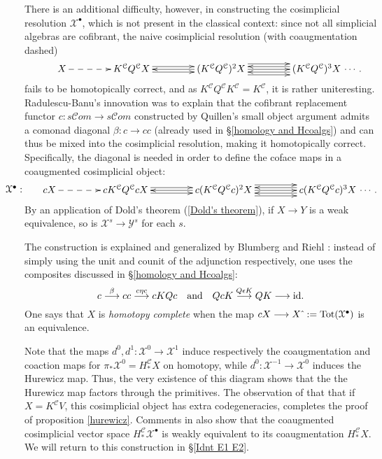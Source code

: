 \documentclass[11pt]{amsart}
\theoremstyle{plain}
\theoremstyle{definition}
\renewcommand{\to}{\longrightarrow}
\newcommand{\scrC}{\mathscr{C}}
\newcommand{\calY}{\mathcal{Y}}
\newcommand{\calX}{\mathcal{X}}
\newcommand{\calC}{\mathcal{C}}
\newcommand{\calx}{\mathcal{X}}
\newcommand{\calc}{\mathcal{C}}
\theoremstyle{plain}
\newcommand{\algcat}{{\scrC\!\textit{om}}}%
\begin{document}
\begin{CPiAlgs and CHalgs}
There is an additional difficulty, however,  in constructing the cosimplicial resolution $\calX^{\bullet}$, which is not present in the classical context: since not all simplicial algebras are cofibrant, the naive cosimplicial resolution (with coaugmentation dashed)
\[\makebox[0cm][r]{\,$\qquad $}\vcenter{
\def\labelstyle{\scriptstyle}
\xymatrix@C=1.5cm@1{
X\,
\ar@{-->}[r]
&
\,K^{\calC}Q^{\calC}X\,
\ar[r];[]
&
\,(K^{\calC}Q^{\calC})^2X\,
\ar@<-.65ex>[l];[]
\ar@<+.65ex>[l];[]
\ar@<+.65ex>[r];[]
\ar@<-.65ex>[r];[]
&
\,(K^{\calC}Q^{\calC})^3X\,\makebox[0cm][l]{\,$\cdots. $}
\ar[l];[]
\ar@<-1.3ex>[l];[]
\ar@<+1.3ex>[l];[]
}}\]
fails to be homotopically correct, and  as $K^{\calC}Q^{\calC}K^{\calC}=K^{\calC}$, it is rather uniteresting. Radulescu-Banu's innovation was to explain that the cofibrant replacement functor $c:s\algcat\to s\algcat$ constructed by Quillen's small object argument \cite{QuillenHomAlg.pdf} admits a comonad diagonal $\beta:c\to cc$  (already used in \S\ref{homology and Hcoalgs}) and can thus be mixed into the cosimplicial resolution, making it homotopically correct. Specifically, the diagonal is needed in order  to define the coface maps in a coaugmented cosimplicial object:
\[\makebox[0cm][r]{\,$\calX^\bullet:\qquad $}\vcenter{
\def\labelstyle{\scriptstyle}
\xymatrix@C=1.5cm@1{
cX\,
\ar@{-->}[r]
&
\,cK^{\calC}Q^{\calC}cX\,
\ar[r];[]
&
\,c(K^{\calC}Q^{\calC}c)^2X\,
\ar@<-.65ex>[l];[]
\ar@<+.65ex>[l];[]
\ar@<+.65ex>[r];[]
\ar@<-.65ex>[r];[]
&
\,c(K^{\calC}Q^{\calC}c)^3X\,\makebox[0cm][l]{\,$\cdots. $}
\ar[l];[]
\ar@<-1.3ex>[l];[]
\ar@<+1.3ex>[l];[]
}}\]
By an application of Dold's theorem (\ref{Dold's theorem}), if $X\to Y$ is a weak equivalence, so is $\calx^s\to\calY^s$ for each $s$.

The construction is explained and generalized by Blumberg and Riehl \cite[\S4]{BlumRiehlResolutions.pdf}: instead of simply using the unit and counit of the adjunction respectively, one uses the composites discussed in \S\ref{homology and Hcoalgs}:
\[c\overset{\beta}{\to}cc\overset{c\eta c}{\to}cKQc\textup{\quad and\quad }QcK\overset{Q\epsilon K}{\to}QK\to \textup{id}.\]
One says that $X$ is \emph{homotopy complete} when the map $cX\to X\hat{\ }:=\textup{Tot}(\calX^\bullet)$ is an equivalence.


Note that the maps $d^0,d^1:\calX^{0}\to\calX^{1}$ induce respectively the coaugmentation and coaction maps for $\pi_*\calx^{0}=H_*^{\calc}X$ on homotopy, while $d^0:\calX^{-1}\to\calX^{0}$ induces the Hurewicz map. Thus, the very existence of this diagram shows that the the Hurewicz map factors through the primitives. The observation of \cite{BlumRiehlResolutions.pdf} that that if $X=K^\calC V$, this cosimplicial object has extra codegeneracies, completes the proof of proposition \ref{hurewicz}.
Comments in \cite{BlumRiehlResolutions.pdf} also show that the coaugmented cosimplicial vector space $H_*^{\calc}\calX^\bullet$  is weakly equivalent to its coaugmentation $H_*^{\calc}X$.
We will return to this construction in \S\ref{Idnt E1 E2}.




\end{CPiAlgs and CHalgs}
\end{document}
